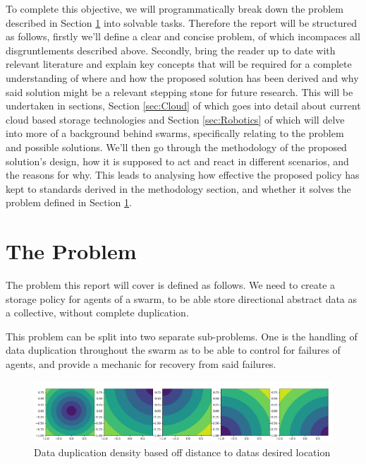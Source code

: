 \documentclass{UoYCSproject}
\begin{document}
To complete this objective, we will programmatically break down the problem described in Section \ref{sec:Problem} into solvable tasks.
Therefore the report will be structured as follows, firstly we’ll define a clear and concise problem, of which incompaces all disgruntlements described above.
Secondly, bring the reader up to date with relevant literature and explain key concepts that will be required for a complete understanding of where and how the proposed solution has been derived and why said solution might be a relevant stepping stone for future research.
This will be undertaken in sections, Section \ref{sec:Cloud} of which goes into detail about current cloud based storage technologies and Section \ref{sec:Robotics} of which will delve into more of a background behind swarms, specifically relating to the problem and possible solutions.
We’ll then go through the methodology of the proposed solution’s design, how it is supposed to act and react in different scenarios, and the reasons for why.
This leads to analysing how effective the proposed policy has kept to standards derived in the methodology section, and whether it solves the problem defined in Section \ref{sec:Problem}.



\section{The Problem}
\label{sec:Problem}

The problem this report will cover is defined as follows. 
We need to create a storage policy for agents of a swarm, to be able store directional abstract data as a collective, without complete duplication.

This problem can be split into two separate sub-problems. 
One is the handling of data duplication throughout the swarm as to be able to control for failures of agents, and provide a mechanic for recovery from said failures. 

\begin{figure}[htb]
\label{fig:popdensity}
\begin{center}
\centering
\includegraphics[width=\linewidth]{"./ExplanationImgs/Memory_Pop_Density.png"}
\caption{Data duplication density based off distance to datas desired location}
\end{center}
\end{figure}
\end{document}
